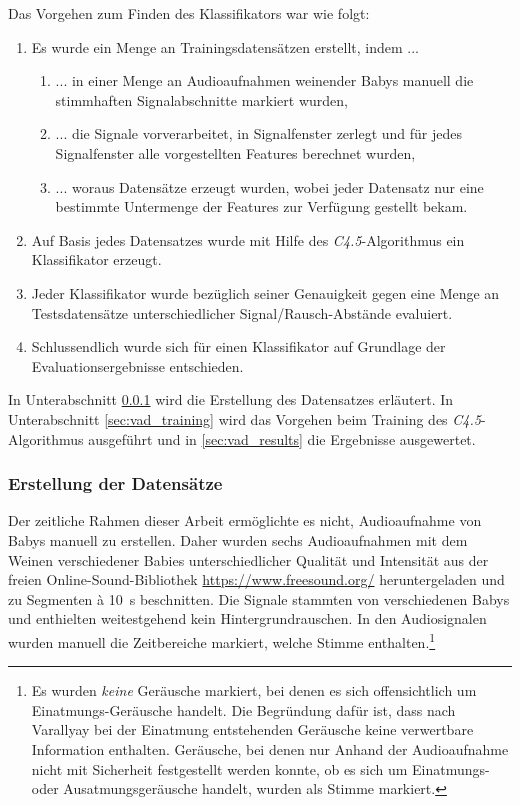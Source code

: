 Das Vorgehen zum Finden des Klassifikators war wie folgt:
\begin{enumerate}
\item Es wurde ein Menge an Trainingsdatensätzen erstellt, indem ...
	\begin{enumerate}[label*=\arabic*.]
	\item ... in einer Menge an Audioaufnahmen weinender Babys manuell die stimmhaften Signalabschnitte markiert wurden,
	\item ... die Signale vorverarbeitet, in Signalfenster zerlegt und für jedes Signalfenster alle vorgestellten Features berechnet wurden,
	\item ... woraus Datensätze erzeugt wurden, wobei jeder Datensatz nur eine bestimmte Untermenge der Features zur Verfügung gestellt bekam.
	\end{enumerate}
\item Auf Basis jedes Datensatzes wurde mit Hilfe des \emph{C4.5}-Algorithmus ein Klassifikator erzeugt.
\item Jeder Klassifikator wurde bezüglich seiner Genauigkeit gegen eine Menge an Testsdatensätze unterschiedlicher Signal/Rausch-Abstände evaluiert.
\item Schlussendlich wurde sich für einen Klassifikator auf Grundlage der Evaluationsergebnisse entschieden.
\end{enumerate}

In Unterabschnitt \ref{sec:vad_database} wird die Erstellung des Datensatzes erläutert. In Unterabschnitt \ref{sec:vad_training} wird das Vorgehen beim Training des \emph{C4.5}-Algorithmus ausgeführt und in \autoref{sec:vad_results} die Ergebnisse ausgewertet.

\subsubsection{Erstellung der Datensätze}
\label{sec:vad_database}

Der zeitliche Rahmen dieser Arbeit ermöglichte es nicht, Audioaufnahme von Babys manuell zu erstellen. Daher wurden sechs Audioaufnahmen mit dem Weinen verschiedener Babies unterschiedlicher Qualität und Intensität aus der freien Online-Sound-Bibliothek \url{https://www.freesound.org/} heruntergeladen und zu Segmenten \`{a} \SI{10}{\second} beschnitten. Die Signale stammten von verschiedenen Babys und enthielten weitestgehend kein Hintergrundrauschen. In den Audiosignalen wurden manuell die Zeitbereiche markiert, welche Stimme enthalten.\footnote{Es wurden \emph{keine} Geräusche markiert, bei denen es sich offensichtlich um Einatmungs-Geräusche handelt. Die Begründung dafür ist, dass nach Varallyay \cite{cry_thesis} bei der Einatmung entstehenden Geräusche keine verwertbare Information enthalten. Geräusche, bei denen nur Anhand der Audioaufnahme nicht mit Sicherheit festgestellt werden konnte, ob es sich um Einatmungs- oder Ausatmungsgeräusche handelt, wurden als Stimme markiert.}


